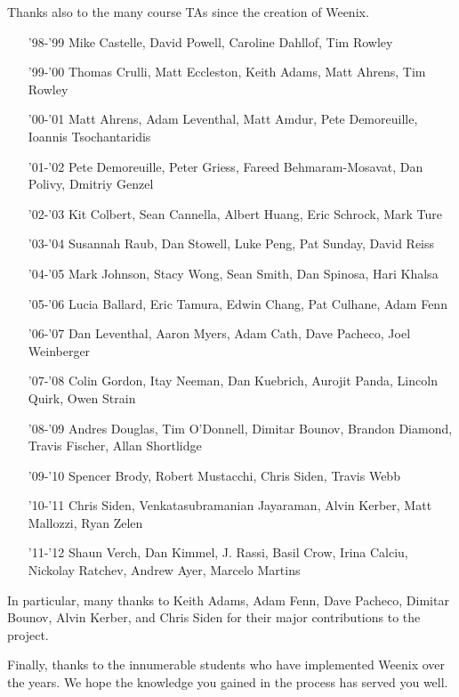 Thanks also to the many course TAs since the creation of Weenix.
\begin{itemize}
    \item['98-'99] Mike Castelle, David Powell, Caroline Dahllof, Tim Rowley
    \item['99-'00] Thomas Crulli, Matt Eccleston, Keith Adams, Matt Ahrens, Tim Rowley
    \item['00-'01] Matt Ahrens, Adam Leventhal, Matt Amdur, Pete Demoreuille, Ioannis Tsochantaridis
    \item['01-'02] Pete Demoreuille, Peter Griess, Fareed Behmaram-Mosavat, Dan Polivy, Dmitriy Genzel
    \item['02-'03] Kit Colbert, Sean Cannella, Albert Huang, Eric Schrock, Mark Ture
    \item['03-'04] Susannah Raub, Dan Stowell, Luke Peng, Pat Sunday, David Reiss
    \item['04-'05] Mark Johnson, Stacy Wong, Sean Smith, Dan Spinosa, Hari Khalsa
    \item['05-'06] Lucia Ballard, Eric Tamura, Edwin Chang, Pat Culhane, Adam Fenn
    \item['06-'07] Dan Leventhal, Aaron Myers, Adam Cath, Dave Pacheco, Joel Weinberger
    \item['07-'08] Colin Gordon, Itay Neeman, Dan Kuebrich, Aurojit Panda, Lincoln Quirk, Owen Strain
    \item['08-'09] Andres Douglas, Tim O'Donnell, Dimitar Bounov, Brandon Diamond, Travis Fischer, Allan Shortlidge
    \item['09-'10] Spencer Brody, Robert Mustacchi, Chris Siden, Travis Webb
    \item['10-'11] Chris Siden, Venkatasubramanian Jayaraman, Alvin Kerber, Matt Mallozzi, Ryan Zelen
    \item['11-'12] Shaun Verch, Dan Kimmel, J. Rassi, Basil Crow, Irina	Calciu, Nickolay Ratchev, Andrew Ayer, Marcelo Martins
\end{itemize}
In particular, many thanks to Keith Adams, Adam Fenn, Dave Pacheco, Dimitar Bounov, Alvin Kerber, and Chris Siden for their major contributions to the project.

Finally, thanks to the innumerable students who have implemented Weenix over the years. We hope the knowledge you gained in the process has served you well.

